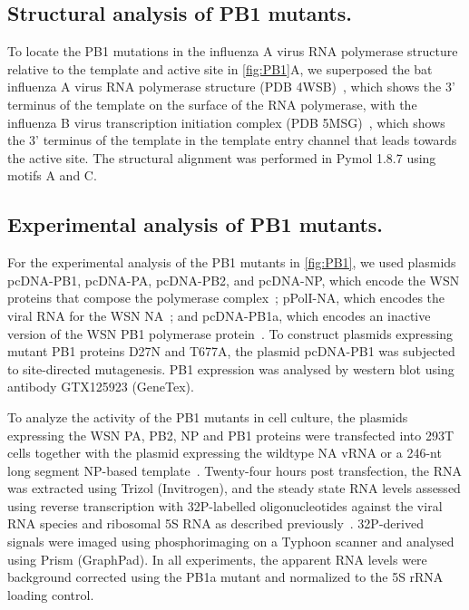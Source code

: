 \documentclass[lineno]{asm-article}
\newcommand{\FIG}[1]{\autoref{fig:#1}}
\begin{document}
\subsection{Structural analysis of PB1 mutants.}
To locate the PB1 mutations in the influenza A virus RNA polymerase structure relative to the template and active site in \FIG{PB1}A, we superposed the bat influenza A virus RNA polymerase structure (PDB 4WSB)~\cite{reich2014structural}, which shows the 3' terminus of the template on the surface of the RNA polymerase, with the influenza B virus transcription initiation complex (PDB 5MSG)~\cite{reich2017vitro}, which shows the 3' terminus of the template in the template entry channel that leads towards the active site.
The structural alignment was performed in Pymol 1.8.7 using motifs A and C.

\subsection{Experimental analysis of PB1 mutants.}
For the experimental analysis of the PB1 mutants in \FIG{PB1}, we used plasmids pcDNA-PB1, pcDNA-PA, pcDNA-PB2, and pcDNA-NP, which encode the WSN proteins that compose the polymerase complex~\cite{fodor2002single}; pPolI-NA, which encodes the viral RNA for the WSN NA~\cite{fodor2002single}; and pcDNA-PB1a, which encodes an inactive version of the WSN PB1 polymerase protein~\cite{vreede2004model}. 
To construct plasmids expressing mutant PB1 proteins D27N and T677A, the plasmid pcDNA-PB1 was subjected to site-directed mutagenesis. 
PB1 expression was analysed by western blot using antibody GTX125923 (GeneTex).

To analyze the activity of the PB1 mutants in cell culture, the plasmids expressing the WSN PA, PB2, NP and PB1 proteins were transfected into 293T cells together with the plasmid expressing the wildtype NA vRNA or a 246-nt long segment NP-based template~\cite{velthuis2018mini}.
Twenty-four hours post transfection, the RNA was extracted using Trizol (Invitrogen), and the steady state RNA levels assessed using reverse transcription with 32P-labelled oligonucleotides against the viral RNA species and ribosomal 5S RNA as described previously~\cite{velthuis2018mini, velthuis2016role}.
32P-derived signals were imaged using phosphorimaging on a Typhoon scanner and analysed using Prism (GraphPad).
In all experiments, the apparent RNA levels were background corrected using the PB1a mutant and normalized to the 5S rRNA loading control.
\end{document}

